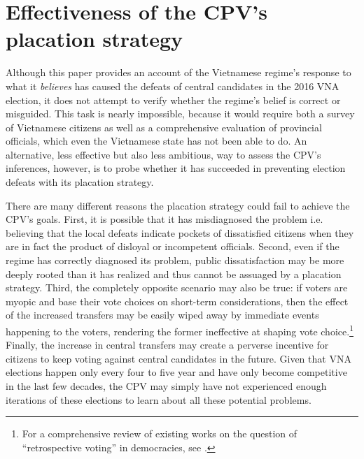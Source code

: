 \documentclass[12pt]{article}
\newcommand\fnote[1]{\footnote{\baselineskip=2\normalbaselineskip#1}}
\newcommand{\1}{\mathbbm{1}}
\begin{document}
\section{Effectiveness of the CPV's placation strategy}
\label{app:repeat}

Although this paper provides an account of the Vietnamese regime's response to what it \textit{believes} has caused the defeats of central candidates in the 2016 VNA election, it does not attempt to verify whether the regime's belief is correct or misguided. This task is nearly impossible, because it would require both a survey of Vietnamese citizens as well as a comprehensive evaluation of provincial officials, which even the Vietnamese state has not been able to do. An alternative, less effective but also less ambitious, way to assess the CPV's inferences, however, is to probe whether it has succeeded in preventing election defeats with its placation strategy.

There are many different reasons the placation strategy could fail to achieve the CPV's goals. First, it is possible that it has misdiagnosed the problem i.e. believing that the local defeats indicate pockets of dissatisfied citizens when they are in fact the product of disloyal or incompetent officials. Second, even if the regime has correctly diagnosed its problem, public dissatisfaction may be more deeply rooted than it has realized and thus cannot be assuaged by a placation strategy. Third, the completely opposite scenario may also be true: if voters are myopic and base their vote choices on short-term considerations, then the effect of the increased transfers may be easily wiped away by immediate events happening to the voters, rendering the former ineffective at shaping vote choice.\fnote{For a comprehensive review of existing works on the question of ``retrospective voting'' in democracies, see \citet{HealyMalhotra2013}.} Finally, the increase in central transfers may create a perverse incentive for citizens to keep voting against central candidates in the future. Given that VNA elections happen only every four to five year and have only become competitive in the last few decades, the CPV may simply have not experienced enough iterations of these elections to learn about all these potential problems.
\end{document}
